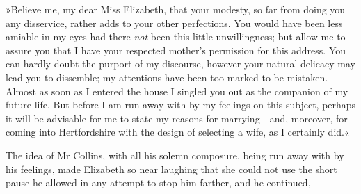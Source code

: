 »Believe me, my dear Miss Elizabeth, that your modesty, so far from doing you any disservice, rather adds to your other perfections. You would have been less amiable in my eyes had there \textit{not} been this little unwillingness; but allow me to assure you that I have your respected mother's permission for this address. You can hardly doubt the purport of my discourse, however your natural delicacy may lead you to dissemble; my attentions have been too marked to be mistaken. Almost as soon as I entered the house I singled you out as the companion of my future life. But before I am run away with by my feelings on this subject, perhaps it will be advisable for me to state my reasons for marrying—and, moreover, for coming into Hertfordshire with the design of selecting a wife, as I certainly did.«



The idea of Mr Collins, with all his solemn composure, being run away with by his feelings, made Elizabeth so near laughing that she could not use the short pause he allowed in any attempt to stop him farther, and he continued,—

